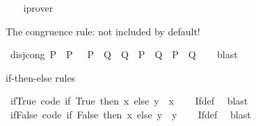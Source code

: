 \begin{isabellebody}
%
\isadelimproof
\ \ %
\endisadelimproof
%
\isatagproof
{}\isamarkupfalse%
\ iprover%
\endisatagproof
{\isafoldproof}%
%
\isadelimproof
%
\endisadelimproof
%
\begin{isamarkuptext}%
The \isa{{\isacharbar}{\kern0pt}} congruence rule: not included by default!%
\end{isamarkuptext}\isamarkuptrue%
\isamarkupfalse%
\ disj{\isacharunderscore}{\kern0pt}cong{\isacharcolon}{\kern0pt}\ {\isachardoublequoteopen}P\ {\isacharequal}{\kern0pt}\ P{\isacharprime}{\kern0pt}\ {\isasymLongrightarrow}\ {\isacharparenleft}{\kern0pt}{\isasymnot}\ P{\isacharprime}{\kern0pt}\ {\isasymLongrightarrow}\ Q\ {\isacharequal}{\kern0pt}\ Q{\isacharprime}{\kern0pt}{\isacharparenright}{\kern0pt}\ {\isasymLongrightarrow}\ {\isacharparenleft}{\kern0pt}P\ {\isasymor}\ Q{\isacharparenright}{\kern0pt}\ {\isacharequal}{\kern0pt}\ {\isacharparenleft}{\kern0pt}P{\isacharprime}{\kern0pt}\ {\isasymor}\ Q{\isacharprime}{\kern0pt}{\isacharparenright}{\kern0pt}{\isachardoublequoteclose}\isanewline
%
\isadelimproof
\ \ %
\endisadelimproof
%
\isatagproof
{}\isamarkupfalse%
\ blast%
\endisatagproof
{\isafoldproof}%
%
\isadelimproof
%
\endisadelimproof
%
\begin{isamarkuptext}%
\medskip if-then-else rules%
\end{isamarkuptext}\isamarkuptrue%
\isamarkupfalse%
\ if{\isacharunderscore}{\kern0pt}True\ {\isacharbrackleft}{\kern0pt}code{\isacharbrackright}{\kern0pt}{\isacharcolon}{\kern0pt}\ {\isachardoublequoteopen}{\isacharparenleft}{\kern0pt}if\ True\ then\ x\ else\ y{\isacharparenright}{\kern0pt}\ {\isacharequal}{\kern0pt}\ x{\isachardoublequoteclose}\isanewline
%
\isadelimproof
\ \ %
\endisadelimproof
%
\isatagproof
{}\isamarkupfalse%
\ If{\isacharunderscore}{\kern0pt}def\ \isamarkupfalse%
\ blast%
\endisatagproof
{\isafoldproof}%
%
\isadelimproof
\isanewline
%
\endisadelimproof
\isanewline
{}\isamarkupfalse%
\ if{\isacharunderscore}{\kern0pt}False\ {\isacharbrackleft}{\kern0pt}code{\isacharbrackright}{\kern0pt}{\isacharcolon}{\kern0pt}\ {\isachardoublequoteopen}{\isacharparenleft}{\kern0pt}if\ False\ then\ x\ else\ y{\isacharparenright}{\kern0pt}\ {\isacharequal}{\kern0pt}\ y{\isachardoublequoteclose}\isanewline
%
\isadelimproof
\ \ %
\endisadelimproof
%
\isatagproof
{}\isamarkupfalse%
\ If{\isacharunderscore}{\kern0pt}def\ \isamarkupfalse%
\ blast%
\endisatagproof
{\isafoldproof}%
%
\isadelimproof
\isanewline

\end{isabellebody}

